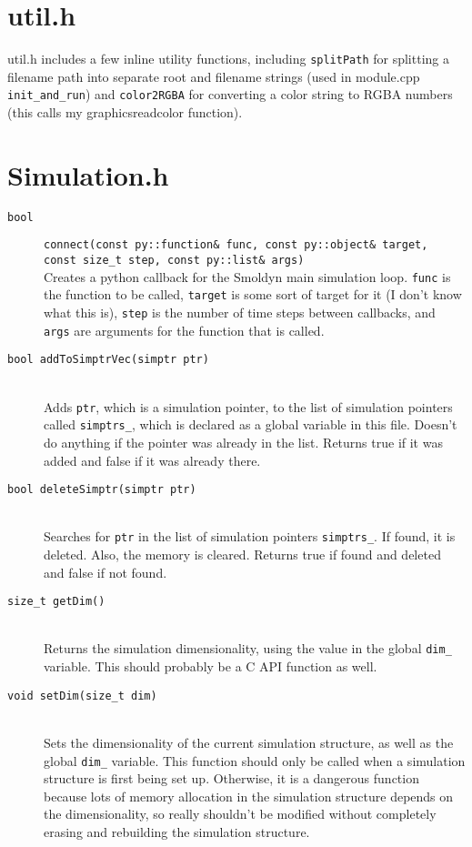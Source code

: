 \documentclass {scrbook}
\newcommand {\ttt} {\texttt}
\begin{document}
\section{util.h}

util.h includes a few inline utility functions, including \ttt{splitPath} for splitting a filename path into separate root and filename strings (used in module.cpp \ttt{init\_and\_run}) and \ttt{color2RGBA} for converting a color string to RGBA numbers (this calls my graphicsreadcolor function).

\section{Simulation.h}

\begin{description}

\item[\ttt{bool}]
\ttt{connect(const py::function\& func, const py::object\& target, const size\_t step, const py::list\& args)}
\hfill \\
Creates a python callback for the Smoldyn main simulation loop. \ttt{func} is the function to be called, \ttt{target} is some sort of target for it (I don't know what this is), \ttt{step} is the number of time steps between callbacks, and \ttt{args} are arguments for the function that is called.

\item[\ttt{bool addToSimptrVec(simptr ptr)}]
\hfill \\
Adds \ttt{ptr}, which is a simulation pointer, to the list of simulation pointers called \ttt{simptrs\_}, which is declared as a global variable in this file. Doesn't do anything if the pointer was already in the list. Returns true if it was added and false if it was already there.

\item[\ttt{bool deleteSimptr(simptr ptr)}]
\hfill \\
Searches for \ttt{ptr} in the list of simulation pointers \ttt{simptrs\_}. If found, it is deleted. Also, the memory is cleared. Returns true if found and deleted and false if not found.

\item[\ttt{size\_t getDim()}]
\hfill \\
Returns the simulation dimensionality, using the value in the global \ttt{dim\_} variable. This should probably be a C API function as well.

\item[\ttt{void setDim(size\_t dim)}]
\hfill \\
Sets the dimensionality of the current simulation structure, as well as the global \ttt{dim\_} variable. This function should only be called when a simulation structure is first being set up. Otherwise, it is a dangerous function because lots of memory allocation in the simulation structure depends on the dimensionality, so really shouldn't be modified without completely erasing and rebuilding the simulation structure.


\end{description}
\end{document}
